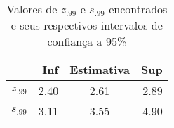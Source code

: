 \begin{table}[ht]
\centering
\caption{Valores de $z_{.99}$ e $s_{.99}$ encontrados e seus
	respectivos intervalos de confian\c ca a 95\%} 
\label{tab:tabevtAAPL2}
\begin{tabular}{rrcr}
  \hline
 & Inf & Estimativa & Sup \\ 
  \hline
$z_{.99}$ & 2.40 & 2.61 & 2.89 \\ 
  $s_{.99}$ & 3.11 & 3.55 & 4.90 \\ 
   \hline
\end{tabular}
\end{table}
